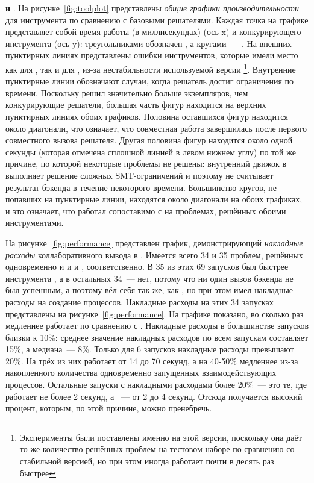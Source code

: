 \textbf{\ringenSync{} и \theringenCICI{}}. На рисунке~\ref{fig:toolplot} представлены \textit{общие графики производительности} для инструмента \theringenCICI{} по сравнению с базовыми решателями. Каждая точка на графике представляет собой время работы (в миллисекундах) \theringenCICI{} (ось x) и конкурирующего инструмента (ось y): треугольниками обозначен \theringen{}, а кругами~--- \racer{}.
На внешних пунктирных линиях представлены ошибки инструментов, которые имели место как для \racer{}, так и для \theringenCICI{}, из-за нестабильности используемой версии \racer{}\footnote{Эксперименты были поставлены именно на этой версии, поскольку она даёт то же количество решённых проблем на тестовом наборе по сравнению со стабильной версией, но при этом иногда работает почти в десять раз быстрее}. Внутренние пунктирные линии обозначают случаи, когда решатель достиг ограничения по времени. Поскольку \theringenCICI{} решил значительно больше экземпляров, чем конкурирующие решатели, большая часть фигур находится на верхних пунктирных линиях обоих графиков. Половина оставшихся фигур находится около диагонали, что означает, что совместная работа завершилась после первого совместного вызова решателя. Другая половина фигур находится около одной секунды (которая отмечена сплошной линией в левом нижнем углу) по той же причине, по которой некоторые проблемы не решены: внутренний движок \racer{} в \theringenCICI{} выполняет решение сложных SMT-ограничений и поэтому не считывает результат бэкенда в течение некоторого времени. Большинство кругов, не попавших на пунктирные линии, находятся около диагонали на обоих графиках, и это означает, что \theringenCICI{} работал сопоставимо с \racer{} на проблемах, решённых обоими инструментами.

На рисунке~\ref{fig:performance} представлен график, демонстрирующий \textit{накладные расходы} коллаборативного вывода в \theringenCICI{}. Имеется всего 34 и 35 проблем, решённых одновременно \racer{} и \ringenCICI{\cvc{}} и \racer{} и \ringenCICI{\vampire{}}, соответственно. В 35 из этих 69 запусков \theringenCICI{} был быстрее инструмента \racer{}, а в остальных 34~--- нет, потому что ни один вызов бэкенда не был успешным, а поэтому \theringenCICI{} вёл себя так же, как \racer{}, но при этом имел накладные расходы на создание процессов. Накладные расходы на этих 34 запусках представлены на рисунке~\ref{fig:performance}. На графике показано, во сколько раз медленнее работает \theringenCICI{} по сравнению с \racer{}. Накладные расходы в большинстве запусков близки к 10\%: среднее значение накладных расходов по всем запускам составляет 15\%, а медиана~--- 8\%.
Только для 6 запусков накладные расходы превышают 20\%. На трёх из них \racer{} работает от 14 до 70 секунд, а \theringenCICI{} на 40-50\% медленнее из-за накопленного количества одновременно запущенных взаимодействующих процессов. Остальные запуски с накладными расходами более 20\%~--- это те, где \racer{} работает не более 2 секунд, а \theringenCICI{}~--- от 2 до 4 секунд. Отсюда получается высокий процент, которым, по этой причине, можно пренебречь.

